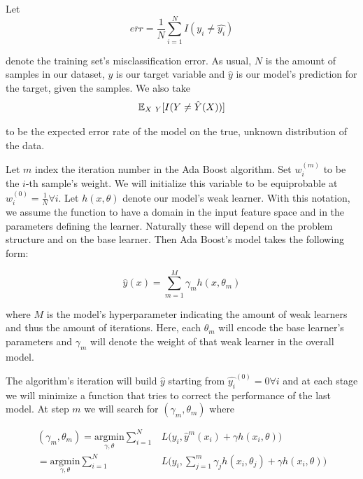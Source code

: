 Let
\begin{equation}\label{equation-adaBoostTrainingError}
\overline{err} = \frac{1}{N} \sum_{i=1}^{N} I(y_i \neq \hat{y_i})
\end{equation}

denote the training set's misclassification error. As usual, $N$ is the amount of samples in our dataset, $y$ is our target variable and $\hat{y}$ is our model's prediction for the target, given the samples. We also take
\begin{equation}
\operatorname{\mathbb{E}}_{X \ Y} [ I(Y \neq \hat{Y}(X)) ]
\end{equation}

to be the expected error rate of the model on the true, unknown distribution of the data.

Let $m$ index the iteration number in the Ada Boost algorithm. Set $w^{(m)}_i$ to be the $i$-th sample's weight. We will initialize this variable to be equiprobable at $w^{(0)}_i = \frac{1}{N} \forall i$. Let $h(x,\theta)$ denote our model's weak learner. With this notation, we assume the function to have a domain in the input feature space and in the parameters defining the learner. Naturally these will depend on the problem structure and on the base learner. Then Ada Boost's model takes the following form:

\begin{equation}\label{equation-adaBoostModel}
\hat{y}(x) = \sum_{m=1}^{M} \gamma_m h(x,\theta_m)
\end{equation}

where $M$ is the model's hyperparameter indicating the amount of weak learners and thus the amount of iterations. Here, each $\theta_m$ will encode the base learner's parameters and $\gamma_m$ will denote the weight of that weak learner in the overall model.

The algorithm's iteration will build $\hat{y}$ starting from $\hat{y_i}^{(0)}= 0 \forall i$ and at each stage we will minimize a function that tries to correct the performance of the last model. At step $m$ we will search for $(\gamma_{m}, \theta_{m})$ where

\begin{equation}\label{equation-adaBoostIteration}
\begin{split}
(\gamma_{m}, \theta_{m}) = \underset{\gamma, \theta}{\mathrm{argmin}} \sum_{i=1}^{N} & L\big( y_i,  \hat{y}^{m}(x_i) + \gamma h(x_i,\theta) \big) \\
= \underset{\gamma, \theta}{\mathrm{argmin}} \sum_{i=1}^{N} & L\big( y_i,  \sum_{j=1}^{m} \gamma_j h(x_i,\theta_j) + \gamma h(x_i,\theta) \big)
\end{split}
\end{equation}

